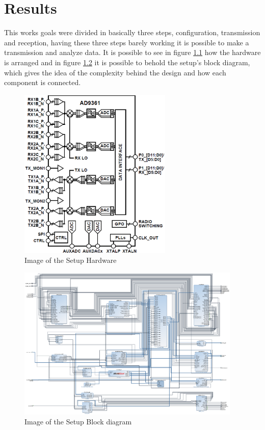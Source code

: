 \chapter{Results}
\label{chap:results}

This works goals were divided in basically three steps, configuration, transmission
and reception, having these three steps barely working it is possible to make a
transmission and analyze data. It is possible to see in figure \ref{fig:setup}
how the hardware is arranged and in figure \ref{fig:setupbd} it is possible to
behold the setup's block diagram, which gives the idea of the complexity behind
the design and how each component is connected.

\begin{figure}[htbp]
    \centering
    \includegraphics[width=0.65\textwidth]{./figures/ad9361_functional_diagram}
    \caption{ Image of the Setup Hardware
    \label{fig:setup}}
\end{figure}

\begin{figure}[htbp]
    \centering
    \includegraphics[width=0.95\textwidth]{./figures/setup_bd}
    \caption{ Image of the Setup Block diagram
    \label{fig:setupbd}}
\end{figure}

